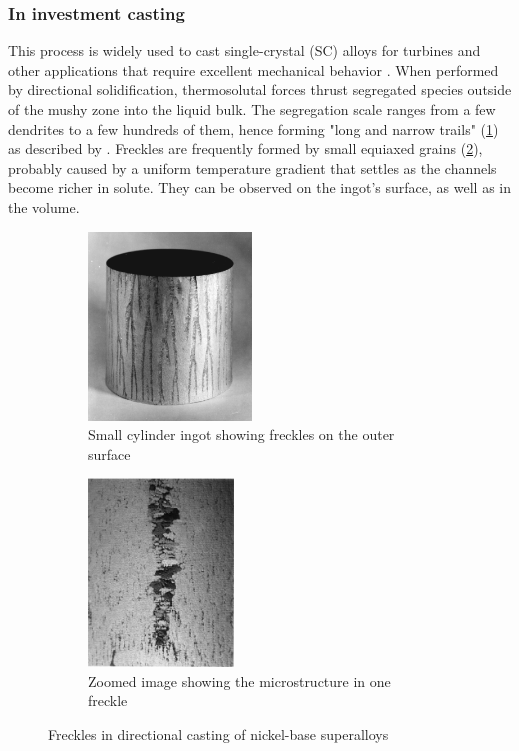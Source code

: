 \subsubsection*{In investment casting}
%
This process is widely used to cast single-crystal (SC) alloys for turbines and other applications 
that require excellent mechanical behavior \citep{giamei_nature_1970}.
When performed by directional solidification, thermosolutal forces thrust segregated species outside of the 
mushy zone into the liquid bulk. The segregation scale ranges from a few dendrites to a few hundreds 
of them, hence forming "long and narrow trails" (\cref{fig:freckle1}) as described by \citet{felicelli_simulation_1991}. 
Freckles are frequently formed by small equiaxed grains (\cref{fig:freckle2}), probably caused by a uniform temperature gradient 
that settles as the channels become richer in solute. They can be observed on the ingot's surface, as well as in the volume.
\begin{figure}[htbp]
\centering
  \begin{subfigure}[t]{0.25\textwidth}
    \centering
	\includegraphics[height=5cm]{Chapter0/Graphics/freckle1.png}
	\caption{Small cylinder ingot showing freckles on the outer surface}
    \label{fig:freckle1}
  \end{subfigure}
   \qquad %
   \begin{subfigure}[t]{0.25\textwidth}
    \centering
	\includegraphics[height=5cm]{Chapter0/Graphics/freckle2.png}
	\caption{Zoomed image showing the microstructure in one freckle}
    \label{fig:freckle2}
  \end{subfigure}
\caption{Freckles in directional casting of nickel-base superalloys} 
\label{fig:freckle}
\end{figure}
%
